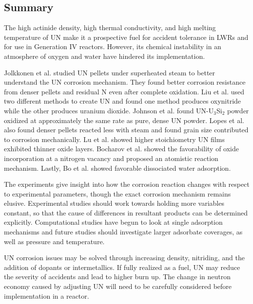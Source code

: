 \documentclass[11pt]{article}
\begin{document}
\begin{multicols}{2}
\section{Summary}
The high actinide density, high thermal conductivity, and high melting temperature of UN make it a prospective fuel for accident tolerance in LWRs and for use in Generation IV reactors. However, its chemical instability in an atmosphere of oxygen and water have hindered its implementation. 
\par Jolkkonen et al. \cite{Jolkkonen2017} studied UN pellets under superheated steam to better understand the UN corrosion mechanism. They found better corrosion resistance from denser pellets and residual N even after complete oxidation. Liu et al. \cite{Liu2013} used two different methods to create UN and found one method produces oxynitride while the other produces uranium dioxide. Johnson et al. \cite{Johnson2016} found UN-U$_{3}$Si$_{2}$ powder oxidized at approximately the same rate as pure, dense UN powder. Lopes et al. \cite{Lopes2017} also found denser pellets reacted less with steam and found grain size contributed to corrosion mechanically. Lu et al. showed higher stoichiometry UN films exhibited thinner oxide layers. Bocharov et al. \cite{Bocharov2013} showed the favorability of oxide incorporation at a nitrogen vacancy and proposed an atomistic reaction mechanism. Lastly, Bo et al. \cite{Bo2016} showed favorable dissociated water adsorption.
\par The experiments give insight into how the corrosion reaction changes with respect to experimental parameters, though the exact corrosion mechanism remains elusive. Experimental studies should work towards holding more variables constant, so that the cause of differences in resultant products can be determined explicitly. Computational studies have begun to look at single adsorption mechanisms and future studies should investigate larger adsorbate coverages, as well as pressure and temperature. 
\par 
UN corrosion issues may be solved through increasing density, nitriding, and the addition of dopants or intermetallics. If fully realized as a fuel, UN may reduce the severity of accidents and lead to higher burn up. The change in neutron economy caused by adjusting UN will need to be carefully considered before implementation in a reactor.








\end{multicols}
\end{document}
